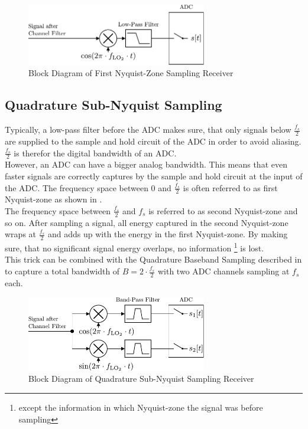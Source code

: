\begin{figure}[p]
  \centering
  \includegraphics[width=0.7\textwidth]{figures/rx_adc_0_bd}
  \caption{Block Diagram of First Nyquist-Zone Sampling Receiver}
  \label{fig:rx_adc_0_bd}
\end{figure}

\subsection{Quadrature Sub-Nyquist Sampling}
\label{sec:rx_adc_2}
Typically, a low-pass filter before the \gls{ADC} makes sure, that only
signals below $\frac{f_s}{2}$ are supplied to the sample and hold circuit
of the \gls{ADC} in order to avoid aliasing.
$\frac{f_s}{2}$ is therefor the digital bandwidth of an \gls{ADC}. \\

However, an \gls{ADC} can have a bigger analog bandwidth. This means that
even faster signals are correctly captures by the sample and hold circuit
at the input of the \gls{ADC}. The frequency space between 0 and
$\frac{f_s}{2}$ is often referred to as first Nyquist-zone as shown in
. \\
The frequency space between $\frac{f_s}{2}$ and $f_s$ is referred to as
second Nyquist-zone and so on. After sampling a signal, all energy captured
in the second Nyquist-zone wraps at $\frac{f_s}{2}$ and adds up with the energy
in the first Nyquist-zone.
By making sure, that no significant signal energy overlaps, no information%
\footnote{except the information in which Nyquist-zone the signal was before
  sampling} is lost. \\

This trick can be combined with the Quadrature Baseband Sampling described
in  to capture a total bandwidth of
$B = 2 \cdot \frac{f_s}{2}$ with two \gls{ADC} channels sampling at $f_s$ each. \\

\begin{figure}[p]
  \centering
  \includegraphics[width=0.7\textwidth]{figures/rx_adc_2_bd}
  \caption{Block Diagram of Quadrature Sub-Nyquist Sampling Receiver}
  \label{fig:rx_adc_2_bd}
\end{figure}

